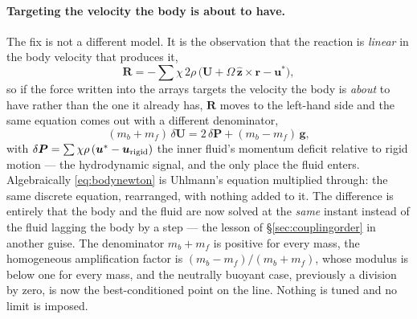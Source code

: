 \documentclass[11pt,a4paper]{article}
\newcommand{\uu}{\bm{u}}
\begin{document}
\paragraph{Targeting the velocity the body is about to have.} The fix is not a
different model. It is the observation that the reaction is \emph{linear} in the
body velocity that produces it,
\[
  \bm{R} = -\sum \chi\,2\rho\,
    \big(\bm{U} + \Omega\,\hat{\bm{z}}\times\bm{r} - \uu^{*}\big),
\]
so if the force written into the arrays targets the velocity the body is
\emph{about} to have rather than the one it already has, $\bm{R}$ moves to the
left-hand side and the same equation comes out with a different denominator,
\begin{equation}
  (m_b + m_f)\,\delta\bm{U} = 2\,\delta\bm{P} + (m_b - m_f)\,\bm{g},
  \label{eq:bodynewton}
\end{equation}
with $\delta\bm{P} = \sum \chi\rho\,(\uu^{*}-\uu_{\rm rigid})$ the inner fluid's
momentum deficit relative to rigid motion --- the hydrodynamic signal, and the
only place the fluid enters. Algebraically \eqref{eq:bodynewton} is Uhlmann's
equation multiplied through: the same discrete equation, rearranged, with nothing
added to it. The difference is entirely that the body and the fluid are now
solved at the \emph{same} instant instead of the fluid lagging the body by a step
--- the lesson of \S\ref{sec:couplingorder} in another guise. The denominator
$m_b+m_f$ is positive for every mass, the homogeneous amplification factor is
$(m_b-m_f)/(m_b+m_f)$, whose modulus is below one for every mass, and the
neutrally buoyant case, previously a division by zero, is now the
best-conditioned point on the line. Nothing is tuned and no limit is imposed.
\end{document}
